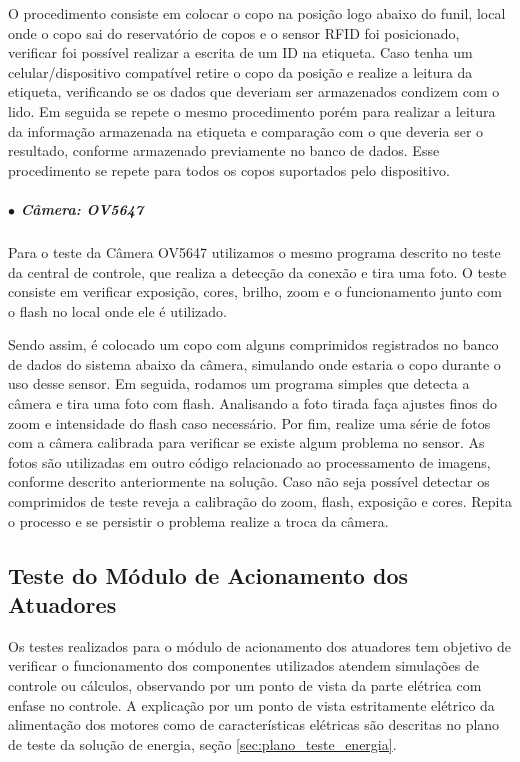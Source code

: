 O procedimento consiste em colocar o copo na posição logo abaixo do funil, local onde o copo sai do reservatório de copos e o sensor RFID foi posicionado, verificar foi possível realizar a escrita de um ID na etiqueta. Caso tenha um celular/dispositivo compatível retire o copo da posição e realize a leitura da etiqueta, verificando se os dados que deveriam ser armazenados condizem com o lido. Em seguida se repete o mesmo procedimento porém para realizar a leitura da informação armazenada na etiqueta e comparação com o que deveria ser o resultado, conforme armazenado previamente no banco de dados. Esse procedimento se repete para todos os copos suportados pelo dispositivo. 


\subparagraph*{$\bullet$ Câmera: OV5647} \hfill

Para o teste da Câmera OV5647 utilizamos o mesmo programa descrito no teste da central de controle, que realiza a detecção da conexão e tira uma foto. O teste consiste em verificar exposição, cores, brilho, zoom e o funcionamento junto com o flash no local onde ele é utilizado. 

Sendo assim, é colocado um copo com alguns comprimidos registrados no banco de dados do sistema abaixo da câmera, simulando onde estaria o copo durante o uso desse sensor. Em seguida, rodamos um programa simples que detecta a câmera e tira uma foto com flash. Analisando a foto tirada faça ajustes finos do zoom e intensidade do flash caso necessário. Por fim, realize uma série de fotos com a câmera calibrada para verificar se existe algum problema no sensor. 
As fotos são utilizadas em outro código relacionado ao processamento de imagens, conforme descrito anteriormente na solução. Caso não seja possível detectar os comprimidos de teste reveja a calibração do zoom, flash, exposição e cores. Repita o processo e se persistir o problema realize a troca da câmera. 

\subsection{Teste do Módulo de Acionamento dos Atuadores}

Os testes realizados para o módulo de acionamento dos atuadores tem objetivo de verificar o funcionamento dos componentes utilizados atendem simulações de controle ou cálculos, observando por um ponto de vista da parte elétrica com enfase no controle. A explicação por um ponto de vista estritamente elétrico da alimentação dos motores como de características elétricas são descritas no plano de teste da solução de energia, seção \ref{sec:plano_teste_energia}.

